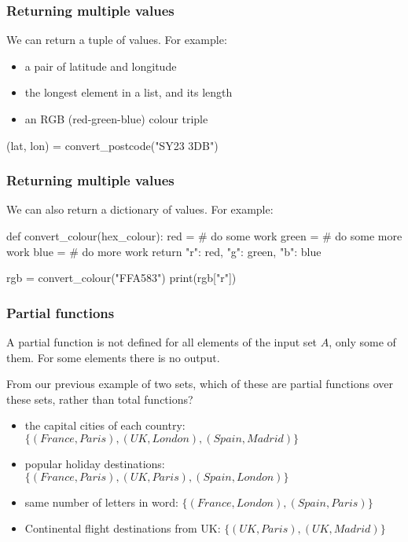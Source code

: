 \documentclass{beamer}
\begin{document}
\begin{frame}[fragile]
\frametitle{Returning multiple values}
We can return a tuple of values. For example:

\begin{itemize}
\item a pair of latitude and longitude
\item the longest element in a list, and its length
\item an RGB (red-green-blue) colour triple
\end{itemize}

\begin{code}
(lat, lon) = convert_postcode("SY23 3DB")
\end{code}
\end{frame}

\begin{frame}[fragile]
\frametitle{Returning multiple values}
We can also return a dictionary of values. For example:

\begin{code}
def convert_colour(hex_colour):
   red = # do some work
   green = # do some more work
   blue = # do more work
   return { "r": red, "g": green, "b": blue }

rgb = convert_colour("FFA583")
print(rgb["r"])
\end{code}
\end{frame}


\begin{frame}[fragile]
\frametitle{Partial functions}
A partial function is not defined for all elements of the input set
$A$, only some
of them. For some elements there is no output. 

From our previous example of two sets, which of these are partial
functions over these sets, rather than total functions?
 
\begin{itemize} 
\item the capital cities of each country: $\{(France, Paris), (UK,
  London), (Spain, Madrid) \}$
\item popular holiday destinations: $\{ (France, Paris), (UK, Paris),
  (Spain, London) \}$
\item same number of letters in word: $\{ (France, London), (Spain,
  Paris) \}$
\item Continental flight destinations from UK: $\{ (UK, Paris), (UK, Madrid) \}$
\end{itemize}
\end{frame}
\end{document}
